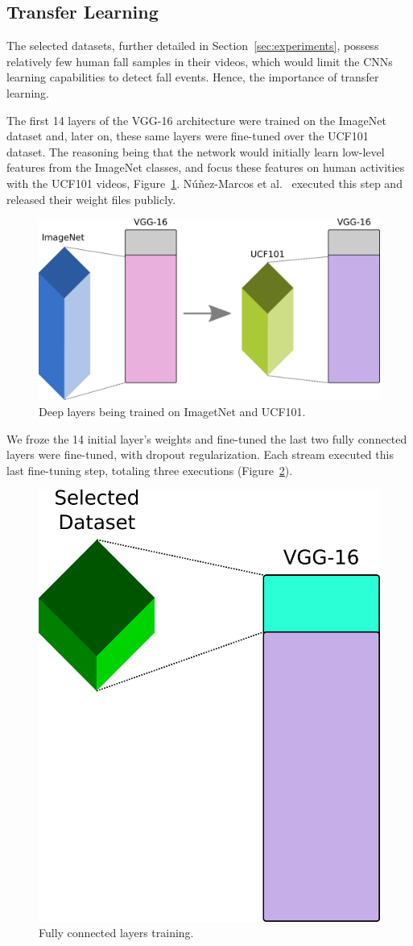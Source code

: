 \documentclass[10pt, conference, compsocconf]{IEEEtran}
\begin{document}
\subsection{Transfer Learning}

The selected datasets, further detailed in Section~\ref{sec:experiments}, possess relatively few human fall samples in their videos, which would limit the CNNs learning capabilities to detect fall events. Hence, the importance of transfer learning.

The first 14 layers of the VGG-16 architecture were trained on the ImageNet~\cite{imagenet_cvpr09} dataset and, later on, these same layers were fine-tuned over the UCF101~\cite{soomro2012ucf101} dataset. The reasoning being that the network would initially learn low-level features from the ImageNet classes, and focus these features on human activities with the UCF101 videos, Figure~\ref{fig:pre14}. N\'u\~nez-Marcos et al.~\cite{nunez2017vision} executed this step and released their weight files publicly.

\begin{figure}[!htb]
\centerline{\includegraphics[width=0.9\linewidth]{figures/pre14.png}}
\caption{Deep layers being trained on ImagetNet and UCF101.}
\label{fig:pre14}
\end{figure}

We froze the 14 initial layer's weights and fine-tuned the
last two fully connected layers were fine-tuned, with dropout regularization. Each stream executed this last fine-tuning step, totaling three executions (Figure~\ref{fig:pos14}).

\begin{figure}[!htb]
\centerline{\includegraphics[width=0.4\linewidth]{figures/pos14.png}}
\caption{Fully connected layers training.}
\label{fig:pos14}
\end{figure}
\end{document}
